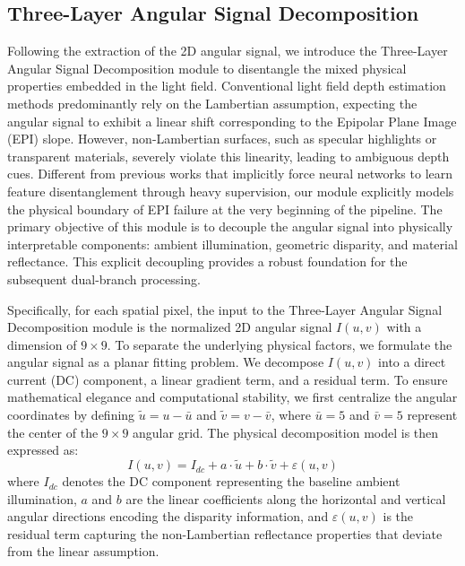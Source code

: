 \documentclass[lettersize,journal]{IEEEtran}
\begin{document}
\subsection{Three-Layer Angular Signal Decomposition}

Following the extraction of the 2D angular signal, we introduce the Three-Layer Angular Signal Decomposition module to disentangle the mixed physical properties embedded in the light field. Conventional light field depth estimation methods predominantly rely on the Lambertian assumption, expecting the angular signal to exhibit a linear shift corresponding to the Epipolar Plane Image (EPI) slope. However, non-Lambertian surfaces, such as specular highlights or transparent materials, severely violate this linearity, leading to ambiguous depth cues. Different from previous works that implicitly force neural networks to learn feature disentanglement through heavy supervision, our module explicitly models the physical boundary of EPI failure at the very beginning of the pipeline. The primary objective of this module is to decouple the angular signal into physically interpretable components: ambient illumination, geometric disparity, and material reflectance. This explicit decoupling provides a robust foundation for the subsequent dual-branch processing.

Specifically, for each spatial pixel, the input to the Three-Layer Angular Signal Decomposition module is the normalized 2D angular signal $I(u,v)$ with a dimension of $9 \times 9$. To separate the underlying physical factors, we formulate the angular signal as a planar fitting problem. We decompose $I(u,v)$ into a direct current (DC) component, a linear gradient term, and a residual term. To ensure mathematical elegance and computational stability, we first centralize the angular coordinates by defining $\tilde{u} = u - \bar{u}$ and $\tilde{v} = v - \bar{v}$, where $\bar{u} = 5$ and $\bar{v} = 5$ represent the center of the $9 \times 9$ angular grid. The physical decomposition model is then expressed as:
\begin{equation}
I(u,v) = I_{dc} + a \cdot \tilde{u} + b \cdot \tilde{v} + \varepsilon(u,v)
\label{eq:ch3_3}
\end{equation}
where $I_{dc}$ denotes the DC component representing the baseline ambient illumination, $a$ and $b$ are the linear coefficients along the horizontal and vertical angular directions encoding the disparity information, and $\varepsilon(u,v)$ is the residual term capturing the non-Lambertian reflectance properties that deviate from the linear assumption.
\end{document}
